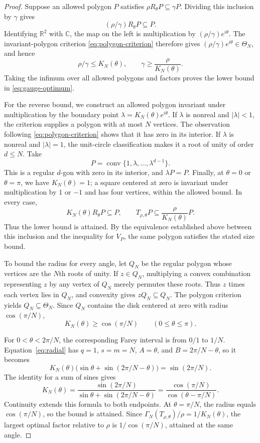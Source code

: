\documentclass[11pt,a4paper]{article}
\theoremstyle{definition}
\theoremstyle{remark}
\numberwithin{equation}{section}
\begin{document}
\begin{proof}
Suppose an allowed polygon $P$ satisfies $\rho R_\theta P\subseteq\gamma P$. Dividing this inclusion by $\gamma$ gives
\[
 (\rho/\gamma)R_\theta P\subseteq P.
\]
Identifying $\mathbb R^2$ with $\mathbb C$, the map on the left is multiplication by $(\rho/\gamma)e^{i\theta}$. The invariant-polygon criterion \eqref{eq:polygon-criterion} therefore gives $(\rho/\gamma)e^{i\theta}\in\Theta_N$, and hence
\[
 \rho/\gamma\le K_N(\theta),\qquad
 \gamma\ge\frac{\rho}{K_N(\theta)}.
\]
Taking the infimum over all allowed polygons and factors proves the lower bound in \eqref{eq:gauge-optimum}.

For the reverse bound, we construct an allowed polygon invariant under multiplication by the boundary point $\lambda=K_N(\theta)e^{i\theta}$. If $\lambda$ is nonreal and $|\lambda|<1$, the criterion supplies a polygon with at most $N$ vertices. The observation following \eqref{eq:polygon-criterion} shows that it has zero in its interior. If $\lambda$ is nonreal and $|\lambda|=1$, the unit-circle classification makes it a root of unity of order $d\le N$. Take
\[
 P=\operatorname{conv}\{1,\lambda,\ldots,\lambda^{d-1}\}.
\]
This is a regular $d$-gon with zero in its interior, and $\lambda P=P$. Finally, at $\theta=0$ or $\theta=\pi$, we have $K_N(\theta)=1$; a square centered at zero is invariant under multiplication by $1$ or $-1$ and has four vertices, within the allowed bound.
In every case,
\[
 K_N(\theta)R_\theta P\subseteq P,
 \qquad
 T_{\rho,\theta}P\subseteq\frac{\rho}{K_N(\theta)}P.
\]
Thus the lower bound is attained. By the equivalence established above between this inclusion and the inequality for $V_P$, the same polygon satisfies the stated size bound.

To bound the radius for every angle, let $Q_N$ be the regular polygon whose vertices are the $N$th roots of unity. If $z\in Q_N$, multiplying a convex combination representing $z$ by any vertex of $Q_N$ merely permutes these roots. Thus $z$ times each vertex lies in $Q_N$, and convexity gives $zQ_N\subseteq Q_N$. The polygon criterion yields $Q_N\subseteq\Theta_N$. Since $Q_N$ contains the disk centered at zero with radius $\cos(\pi/N)$,
\[
 K_N(\theta)\ge\cos(\pi/N)\qquad(0\le\theta\le\pi).
\]

For $0<\theta<2\pi/N$, the corresponding Farey interval is from $0/1$ to $1/N$. Equation~\eqref{eq:radial} has $q=1$, $s=m=N$, $A=\theta$, and $B=2\pi/N-\theta$, so it becomes
\[
 K_N(\theta)\bigl(\sin\theta+\sin(2\pi/N-\theta)\bigr)
 =\sin(2\pi/N).
\]
The identity for a sum of sines gives
\[
 K_N(\theta)=
 \frac{\sin(2\pi/N)}{\sin\theta+\sin(2\pi/N-\theta)}
 =\frac{\cos(\pi/N)}{\cos(\theta-\pi/N)}.
\]
Continuity extends this formula to both endpoints. At $\theta=\pi/N$, the radius equals $\cos(\pi/N)$, so the bound is attained. Since $\Gamma_N(T_{\rho,\theta})/\rho=1/K_N(\theta)$, the largest optimal factor relative to $\rho$ is $1/\cos(\pi/N)$, attained at the same angle.
\end{proof}
\end{document}
